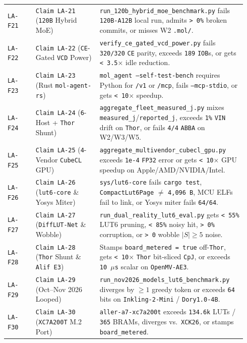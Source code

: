 \documentclass[10pt]{article}
\begin{document}
{\begin{longtable}{@{}L{0.11\linewidth}L{0.25\linewidth}L{0.58\linewidth}@{}}
\texttt{LA-F21} & \texttt{Claim LA-21} (\texttt{120B} Hybrid MoE) & \texttt{run\_120b\_hybrid\_moe\_benchmark.py} fails \texttt{120B-A12B} local run, admits \texttt{> 0\%} broken commits, or misses W2 \texttt{.mol/}. \\
\texttt{LA-F22} & \texttt{Claim LA-22} (\texttt{CE}-Gated \texttt{VCD} Power) & \texttt{verify\_ce\_gated\_vcd\_power.py} fails \texttt{320/320} \texttt{CE} parity, exceeds \texttt{189} \texttt{IOB}s, or gets \texttt{< 3.5$\times$} idle reduction. \\
\texttt{LA-F23} & \texttt{Claim LA-23} (Rust \texttt{mol-agent-rs}) & \texttt{mol\_agent --self-test-bench} requires Python for \texttt{/v1} or \texttt{/mcp}, fails \texttt{--mcp-stdio}, or gets \texttt{< 10$\times$} speedup. \\
\texttt{LA-F24} & \texttt{Claim LA-24} (\texttt{6}-Host + \texttt{Thor} Shunt) & \texttt{aggregate\_fleet\_measured\_j.py} mixes \texttt{measured\_j}/\texttt{reported\_j}, exceeds \texttt{1\%} \texttt{VIN} drift on \texttt{Thor}, or fails \texttt{4/4} \texttt{ABBA} on W2/W3/W5. \\
\texttt{LA-F25} & \texttt{Claim LA-25} (\texttt{4}-Vendor \texttt{CubeCL} GPU) & \texttt{aggregate\_multivendor\_cubecl\_gpu.py} exceeds \texttt{1e-4} \texttt{FP32} error or gets \texttt{< 10$\times$} GPU speedup on Apple/AMD/NVIDIA/Intel. \\
\texttt{LA-F26} & \texttt{Claim LA-26} (\texttt{lut6-core} \& Yosys Miter) & \texttt{sys/lut6-core} fails \texttt{cargo test}, \texttt{CompactLut6Page} $\neq$ \texttt{4,096 B}, MCU ELFs fail to link, or Yosys miter fails \texttt{64/64}. \\
\texttt{LA-F27} & \texttt{Claim LA-27} (\texttt{DiffLUT-Net} \& Wobble) & \texttt{run\_dual\_reality\_lut6\_eval.py} gets \texttt{< 55\%} LUT6 pruning, \texttt{< 85\%} noisy hit, \texttt{> 0\%} corruption, or \texttt{> 0} wobble $|S|\ge 5$ noise. \\
\texttt{LA-F28} & \texttt{Claim LA-28} (\texttt{Thor} Shunt \& \texttt{Alif E3}) & Stamps \texttt{board\_metered = true} off-\texttt{Thor}, gets \texttt{< 10$\times$} \texttt{Thor} bit-sliced \texttt{CpJ}, or exceeds \texttt{10 $\mu$s} scalar on \texttt{OpenMV-AE3}. \\
\texttt{LA-F29} & \texttt{Claim LA-29} (Oct--Nov 2026 Looped) & \texttt{run\_nov2026\_models\_lut6\_benchmark.py} diverges by $\ge 1$ greedy token or exceeds \texttt{64} bits on \texttt{Inkling-2-Mini} / \texttt{Dory1.0-4B}. \\
\texttt{LA-F30} & \texttt{Claim LA-30} (\texttt{XC7A200T} M.2 Port) & \texttt{aller-a7-xc7a200t} exceeds \texttt{134.6k} LUTs / \texttt{365} BRAMs, diverges vs.\ \texttt{XCK26}, or stamps \texttt{board\_metered}. \\

\end{longtable}}
\end{document}
